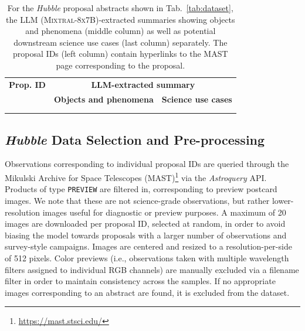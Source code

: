 \documentclass{article} %
\newcommand{\package}[1]{\textsl{#1}\xspace}
\newcommand{\hubble}{\emph{Hubble}\xspace}
\begin{document}
   \begin{table}[h!]
     \renewcommand{\arraystretch}{2}
       \centering
       \begin{tabular}{m{1.8cm} m{3.6cm} m{7.2cm}}
           \toprule
           \bfseries Prop. ID & \multicolumn{2}{c}{\bfseries LLM-extracted summary} \tabularnewline
           \cmidrule(r){2-3}
           & \centering\arraybackslash \bfseries \small{Objects and phenomena} & \centering\arraybackslash \bfseries \small{Science use cases} \tabularnewline
           \midrule
            & {\scriptsize } & {\scriptsize } \tabularnewline
           \midrule
            & {\scriptsize } & {\scriptsize } \tabularnewline
           \bottomrule
       \end{tabular}
       \caption{For the \hubble proposal abstracts shown in Tab.~\ref{tab:dataset}, the LLM (\textsc{Mixtral-8x7B})-extracted summaries showing objects and phenomena (middle column) as well as potential downstream science use cases (last column) separately. The proposal IDs (left column) contain hyperlinks to the MAST page corresponding to the proposal.}
       \label{tab:datasetsumm}
   \end{table}
   
   \subsection{\hubble Data Selection and Pre-processing}
   
   Observations corresponding to individual proposal IDs are queried through the Mikulski Archive for Space Telescopes (MAST)\footnote{\url{https://mast.stsci.edu/}} via the \package{Astroquery} \citep{2019AJ....157...98G} API.
   Products of type \texttt{PREVIEW} are filtered in, corresponding to preview postcard images.
   We note that these are not science-grade observations, but rather lower-resolution images useful for diagnostic or preview purposes.
   A maximum of 20 images are downloaded per proposal ID, selected at random, in order to avoid biasing the model towards proposals with a larger number of observations and survey-style campaigns.
   Images are centered and resized to a resolution-per-side of 512 pixels.
   Color previews (i.e., observations taken with multiple wavelength filters assigned to individual RGB channels) are manually excluded via a filename filter in order to maintain consistency across the samples.
   If no appropriate images corresponding to an abstract are found, it is excluded from the dataset.
   
\end{document}
